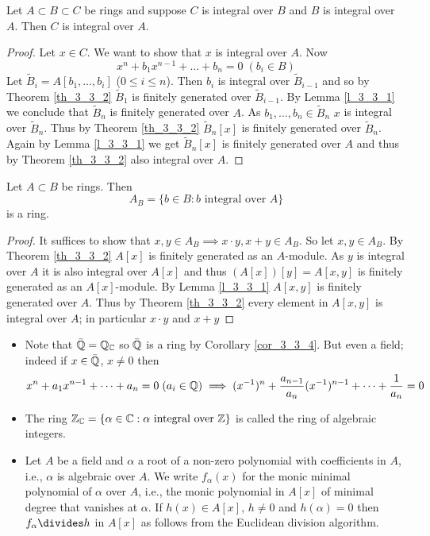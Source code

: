 \documentclass[NumTh.tex]{subfiles}
\begin{document}
\begin{cor}
  Let $A \subset B \subset C$ be rings and suppose $C$ is integral over $B$ and $B$ is integral over $A$.
  Then $C$ is  integral over $A$.
\end{cor}

\begin{proof}
  Let $x \in C$.
  We want to show that $x$ is integral over $A$.
  Now 
  \[ x^n + b_1 x^{n-1} + \dots + b_n = 0 \; (b_i \in B) \]
  Let $\tilde{B}_i = A[b_1,\dots,b_i]$ ($0 \leq i \leq n$).
  Then $b_i$ is integral over $\tilde{B}_{i-1}$ and so by Theorem \ref{th_3_3_2} $\tilde{B}_1$ is finitely generated over $\tilde{B}_{i-1}$.
  By Lemma \ref{l_3_3_1} we conclude that $\tilde{B}_n$ is finitely generated over $A$.
  As $b_1,\dots,b_n \in \tilde{B}_n$ $x$ is integral over $\tilde{B}_n$.
  Thus by Theorem \ref{th_3_3_2} $\tilde{B}_n[x]$ is finitely generated over $\tilde{B}_n$.
  Again by Lemma \ref{l_3_3_1} we get $\tilde{B}_n[x]$ is finitely generated over $A$ and thus by Theorem \ref{th_3_3_2} also integral over $A$.
\end{proof}

\begin{cor}
  Let $A \subset B$ be rings. Then 
  \[ A_B = \{ b \in B : b \text{ integral over } A \} \]
  is a ring.
\end{cor}

\begin{proof}
  It suffices to show that $x,y\in A_B \implies x \cdot y , x+y \in  A_B$.
  So let $x,y \in A_B$.
  By Theorem \ref{th_3_3_2} $A[x]$ is finitely generated as an $A$-module.
  As $y$ is integral over $A$ it is also integral over $A[x]$ and thus $(A[x])[y] = A[x,y]$ is finitely generated as an $A[x]$-module.
  By Lemma \ref{l_3_3_1} $A[x,y]$ is finitely generated over $A$.
  Thus by Theorem \ref{th_3_3_2} every element in $A[x,y]$ is integral over $A$; in particular $x \cdot y$ and $x+y$
\end{proof}

\begin{rem}
  \begin{itemize}
    \item Note that $\bar{\mathbb{Q}} = \mathbb{Q}_{\mathbb{C}}$ so $\bar{\mathbb{Q}}$ is a ring by Corollary \ref{cor_3_3_4}.
    But even a field; indeed if $x \in \bar{\mathbb{Q}}$, $x \neq 0$ then 
    \[ x^n + a_1 x^{n-1} + \dots + a_n = 0 \; (a_i \in \mathbb{Q}) \implies (x^{-1})^n + \frac{a_{n-1}}{a_n}(x^{-1})^{n-1} + \dots + \frac{1}{a_n} = 0 \]
    \item The ring $\mathbb{Z}_{\mathbb{C}} = \{ \alpha \in \mathbb{C}: \alpha \text{ integral over } \mathbb{Z} \}$ is called the ring of algebraic integers.
    \item Let $A$ be a field and $\alpha$ a root of a non-zero polynomial with coefficients in $A$,
    i.e., $\alpha$ is algebraic over $A$.
    We write $f_\alpha(x)$ for the monic minimal polynomial of $\alpha$ over $A$,
    i.e., the monic polynomial in $A[x]$ of minimal degree that vanishes at $\alpha$.
    If $h(x) \in A[x]$, $h \neq 0$ and $h(\alpha) = 0$ then $f_\alpha \divides h$ in $A[x]$ as follows from the Euclidean division algorithm.
    \end{itemize}
\end{rem}
\end{document}

